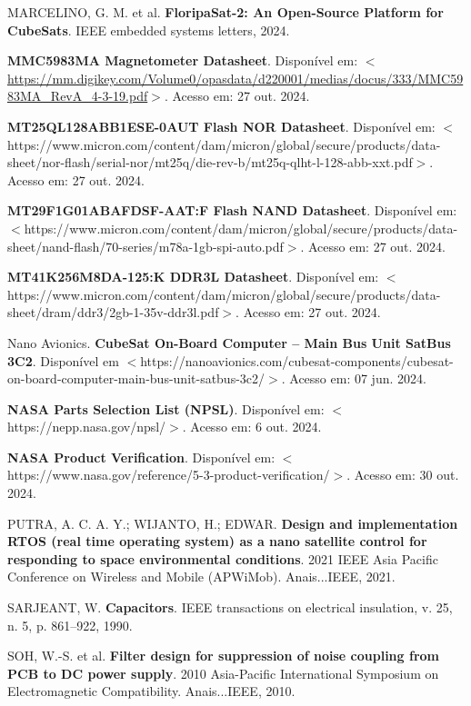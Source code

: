 \begin{flushleft}
\begin{thebibliography}{00}
 MARCELINO, G. M. et al. \textbf{FloripaSat-2: An Open-Source Platform for CubeSats}. IEEE embedded systems letters, 2024.

 \textbf{MMC5983MA Magnetometer Datasheet}. Disponível em: $<$\url{https://mm.digikey.com/Volume0/opasdata/d220001/medias/docus/333/MMC5983MA\_RevA\_4-3-19.pdf}$>$. Acesso em: 27 out. 2024. 

 \textbf{MT25QL128ABB1ESE-0AUT Flash NOR Datasheet}. Disponível em: $<$https://www.micron.com/content/dam/micron/global/secure/products/data-sheet/nor-flash/serial-nor/mt25q/die-rev-b/mt25q-qlht-l-128-abb-xxt.pdf$>$. Acesso em: 27 out. 2024. 

 \textbf{MT29F1G01ABAFDSF-AAT:F Flash NAND Datasheet}. Disponível em: $<$https://www.micron.com/content/dam/micron/global/secure/products/data-sheet/nand-flash/70-series/m78a-1gb-spi-auto.pdf$>$. Acesso em: 27 out. 2024. 

 \textbf{MT41K256M8DA-125:K DDR3L Datasheet}. Disponível em: $<$https://www.micron.com/content/dam/micron/global/secure/products/data-sheet/dram/ddr3/2gb-1-35v-ddr3l.pdf$>$. Acesso em: 27 out. 2024. 

 Nano Avionics. \textbf{CubeSat On-Board Computer – Main Bus Unit SatBus 3C2}. Disponível em $<$https://nanoavionics.com/cubesat-components/cubesat-on-board-computer-main-bus-unit-satbus-3c2/$>$. Acesso em: 07 jun. 2024.

 \textbf{NASA Parts Selection List (NPSL)}. Disponível em: $<$https://nepp.nasa.gov/npsl/$>$. Acesso em: 6 out. 2024.

 \textbf{NASA Product Verification}. Disponível em: $<$https://www.nasa.gov/reference/5-3-product-verification/$>$. Acesso em: 30 out. 2024.

 PUTRA, A. C. A. Y.; WIJANTO, H.; EDWAR. \textbf{Design and implementation RTOS (real time operating system) as a nano satellite control for responding to space environmental conditions}. 2021 IEEE Asia Pacific Conference on Wireless and Mobile (APWiMob). Anais...IEEE, 2021.

 SARJEANT, W. \textbf{Capacitors}. IEEE transactions on electrical insulation, v. 25, n. 5, p. 861–922, 1990.

 SOH, W.-S. et al. \textbf{Filter design for suppression of noise coupling from PCB to DC power supply}. 2010 Asia-Pacific International Symposium on Electromagnetic Compatibility. Anais...IEEE, 2010.


\end{thebibliography}
\end{flushleft}
